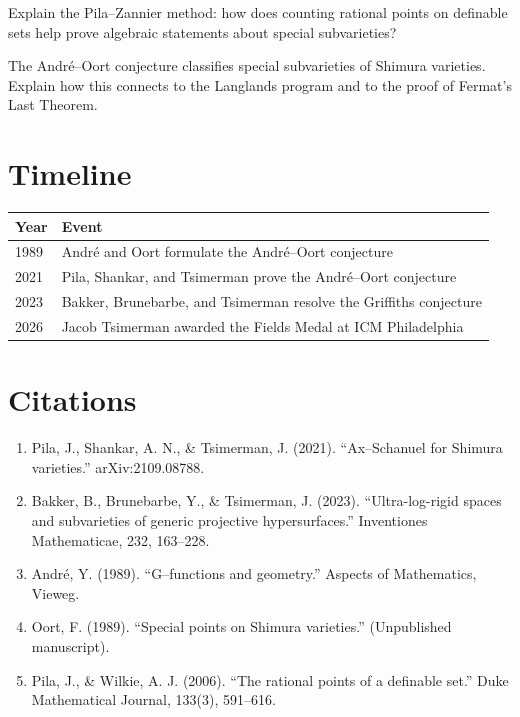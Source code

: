 \begin{exercise}[Intermediate]
Explain the Pila--Zannier method: how does counting rational points on definable sets help prove algebraic statements about special subvarieties?
\end{exercise}

\begin{exercise}[Challenge]
The André--Oort conjecture classifies special subvarieties of Shimura varieties. Explain how this connects to the Langlands program and to the proof of Fermat's Last Theorem.
\end{exercise}

\section{Timeline}

\begin{tabularx}{\linewidth}{lX}
\toprule
\textbf{Year} & \textbf{Event} \\ \midrule
1989 & André and Oort formulate the André--Oort conjecture \\
2021 & Pila, Shankar, and Tsimerman prove the André--Oort conjecture \\
2023 & Bakker, Brunebarbe, and Tsimerman resolve the Griffiths conjecture \\
2026 & Jacob Tsimerman awarded the Fields Medal at ICM Philadelphia \\
\bottomrule
\end{tabularx}

\section{Citations}

\begin{enumerate}
\item Pila, J., Shankar, A. N., \& Tsimerman, J. (2021). ``Ax--Schanuel for Shimura varieties.'' arXiv:2109.08788.
\item Bakker, B., Brunebarbe, Y., \& Tsimerman, J. (2023). ``Ultra-log-rigid spaces and subvarieties of generic projective hypersurfaces.'' Inventiones Mathematicae, 232, 163--228.
\item André, Y. (1989). ``G--functions and geometry.'' Aspects of Mathematics, Vieweg.
\item Oort, F. (1989). ``Special points on Shimura varieties.'' (Unpublished manuscript).
\item Pila, J., \& Wilkie, A. J. (2006). ``The rational points of a definable set.'' Duke Mathematical Journal, 133(3), 591--616.
\end{enumerate}
